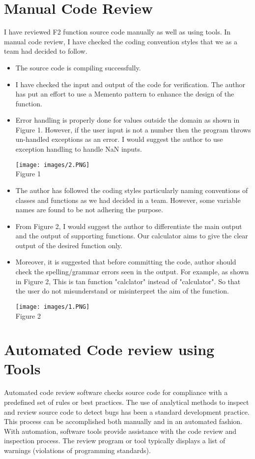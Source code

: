 \documentclass[10pt,letterpaper]{article}
\begin{document}
\section{Manual Code Review}
I have reviewed F2 function source code manually as well as using tools. In manual code review, I have checked the coding convention styles that we as a team had decided to follow. 
\begin{itemize}
\item The source code is compiling successfully.
\item I have checked the input and output of the code for verification. The author has put an effort to use a Memento pattern to enhance the design of the function. 
\item Error handling is properly done for values outside the domain as shown in Figure 1. However, if the user input is not a number then the program throws un-handled exceptions as an error. I would suggest the author to use exception handling to handle NaN inputs.
\begin{center}
    \texttt{[image: images/2.PNG]}\\
  \caption{Figure 1}
\end{center} 
\item The author has followed the coding styles particularly naming conventions of classes and functions as we had decided in a team. However, some variable names are found to be not adhering the purpose.
\item From Figure 2, I would suggest the author to differentiate the main output and the output of supporting functions. Our calculator aims to give the clear output of the desired function only.
\item Moreover, it is suggested that before committing the code, author should check the spelling/grammar errors seen in the output. For example, as shown in Figure 2, This is tan function "calclator" instead of "calculator". So that the user do not misunderstand or misinterpret the aim of the function.
\begin{center}
    \texttt{[image: images/1.PNG]}\\
  \caption{Figure 2}
\end{center} 
\end{itemize}
\section{Automated Code review using Tools}
Automated code review software checks source code for compliance with a predefined set of rules or best practices. The use of analytical methods to inspect and review source code to detect bugs has been a standard development practice. This process can be accomplished both manually and in an automated fashion. With automation, software tools provide assistance with the code review and inspection process. The review program or tool typically displays a list of warnings (violations of programming standards). \cite{Wikipedia}
\end{document}
